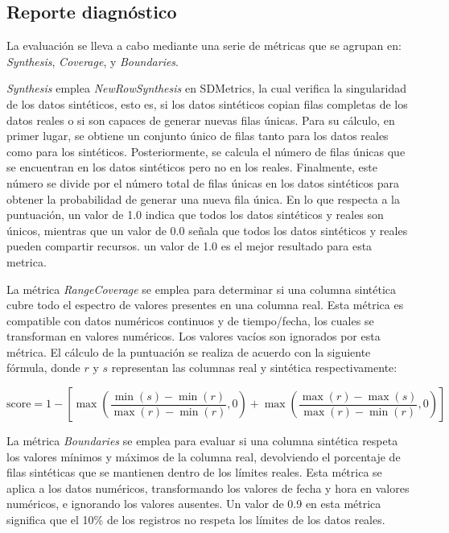 \subsection{Reporte diagnóstico}
\label{Diagnostic Report}
La evaluación se lleva a cabo mediante una serie de métricas que se agrupan en: \emph{Synthesis}, \emph{Coverage}, y \emph{Boundaries}.

\emph{Synthesis} emplea \emph{NewRowSynthesis} en SDMetrics, la cual verifica la singularidad de los datos sintéticos, esto es, si los datos sintéticos copian filas completas de los datos reales o si son capaces de generar nuevas filas únicas. Para su cálculo, en primer lugar, se obtiene un conjunto único de filas tanto para los datos reales como para los sintéticos. Posteriormente, se calcula el número de filas únicas que se encuentran en los datos sintéticos pero no en los reales. Finalmente, este número se divide por el número total de filas únicas en los datos sintéticos para obtener la probabilidad de generar una nueva fila única. En lo que respecta a la puntuación, un valor de 1.0 indica que todos los datos sintéticos y reales son únicos, mientras que un valor de 0.0 señala que todos los datos sintéticos y reales pueden compartir recursos. un valor de 1.0 es el mejor resultado para esta metrica.

La métrica \emph{RangeCoverage} se emplea para determinar si una columna sintética cubre todo el espectro de valores presentes en una columna real. Esta métrica es compatible con datos numéricos continuos y de tiempo/fecha, los cuales se transforman en valores numéricos. Los valores vacíos son ignorados por esta métrica. El cálculo de la puntuación se realiza de acuerdo con la siguiente fórmula, donde \(r\) y \(s\) representan las columnas real y sintética respectivamente:

\[
\text{{score}} = 1 - \left[ \max\left(\frac{{\min(s) - \min(r)}}{{\max(r) - \min(r)}}, 0\right) + \max\left(\frac{{\max(r) - \max(s)}}{{\max(r) - \min(r)}}, 0\right) \right]
\]

La métrica \emph{Boundaries} se emplea para evaluar si una columna sintética respeta los valores mínimos y máximos de la columna real, devolviendo el porcentaje de filas sintéticas que se mantienen dentro de los límites reales. Esta métrica se aplica a los datos numéricos, transformando los valores de fecha y hora en valores numéricos, e ignorando los valores ausentes. Un valor de 0.9 en esta métrica significa que el 10\% de los registros no respeta los límites de los datos reales.




